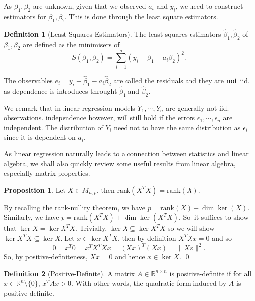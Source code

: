 \documentclass[
]{article}
\theoremstyle{definition}
\newtheorem{prop}{Proposition}
\theoremstyle{definition}
\newtheorem{definition}{Definition}[section]
\begin{document}
As \(\beta_1, \beta_2\) are unknown, given that we observed \(a_i\) and
\(y_i\), we need to construct estimators for \(\beta_1, \beta_2\). This
is done through the least square estimators.

\begin{definition}[Least Squares Estimators]
  The least squares estimators \(\hat \beta_1, \hat \beta_2\) of \(\beta_1, \beta_2\) 
  are defined as the minimisers of 
  \[S(\beta_1, \beta_2) = \sum_{i = 1}^n (y_i - \beta_1 - a_i \beta_2)^2.\]
\end{definition}

The observables \(e_i = y_i - \hat \beta_1 - a_i \hat \beta_2\) are
called the residuals and they are \textbf{not} iid. as dependence is
introduces throught \(\hat \beta_1\) and \(\hat \beta_2\).

We remark that in linear regression models \(Y_1, \cdots, Y_n\) are
generally not iid. observations. independence however, will still hold
if the errors \(\epsilon_1, \cdots, \epsilon_n\) are independent. The
distribution of \(Y_i\) need not to have the same distribution as
\(\epsilon_i\) since it is dependent on \(a_i\).

As linear regression naturally leads to a connection between statistics
and linear algebra, we shall also quickly review some useful results
from linear algebra, especially matrix properties.

\begin{prop}
  Let \(X \in M_{n, p}\), then \(\text{rank}(X^T X) = \text{rank}(X)\).
\end{prop}
\proof

By recalling the rank-nullity theorem, we have
\(p = \text{rank}(X) + \dim \ker(X)\). Similarly, we have
\(p = \text{rank} (X^T X) + \dim \ker (X^T X)\). So, it suffices to show
that \(\ker X = \ker X^T X\). Trivially, \(\ker X \subseteq \ker X^T X\)
so we will show \(\ker X^T X \subseteq \ker X\). Let
\(x \in \ker X^T X\), then by definition \(X^T X x = 0\) and so
\[0 = x^T 0 = x^T X^T X x = (X x)^T(X x) = \|X x\|^2.\] So, by
positive-definiteness, \(X x = 0\) and hence \(x \in \ker X\). \qed

\begin{definition}[Positive-Definite]
  A matrix \(A \in \mathbb{R}^{n \times n}\) is positive-definite if 
  for all \(x \in \mathbb{R}^n \setminus \{0\}\), \(x^T A x > 0\). With other 
  words, the quadratic form induced by \(A\) is positive-definite.
\end{definition}
\end{document}
